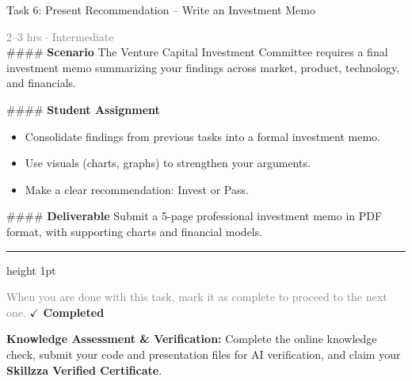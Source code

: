 \documentclass[10pt,a4paper]{article}
\begin{document}
\begin{taskbox}{Task 6: Present Recommendation – Write an Investment Memo}

    {\small \textcolor{gray}{2--3 hrs $\cdot$ Intermediate}}\\[12pt]

    \#\#\#\# \textbf{Scenario}  
The Venture Capital Investment Committee requires a final investment memo summarizing your findings across market, product, technology, and financials.  

\#\#\#\# \textbf{Student Assignment}  
\begin{itemize}
    \item Consolidate findings from previous tasks into a formal investment memo.  
    \item Use visuals (charts, graphs) to strengthen your arguments.  
    \item Make a clear recommendation: Invest or Pass.  
\end{itemize}

\#\#\#\# \textbf{Deliverable}  
Submit a 5-page professional investment memo in PDF format, with supporting charts and financial models.\par

    \vspace{16pt}

    \textcolor{cardBorder}{\hrule height 1pt}\vspace{8pt}

    \small \textcolor{gray}{When you are done with this task, mark it as complete to proceed to the next one.} \hfill \textbf{\textcolor{brandDark}{$\checkmark$ Completed}}

\end{taskbox}

\begin{completionbox}
    \textbf{Knowledge Assessment \& Verification:} Complete the online knowledge check, submit your code and presentation files for AI verification, and claim your \textbf{Skillzza Verified Certificate}.
\end{completionbox}
\end{document}
